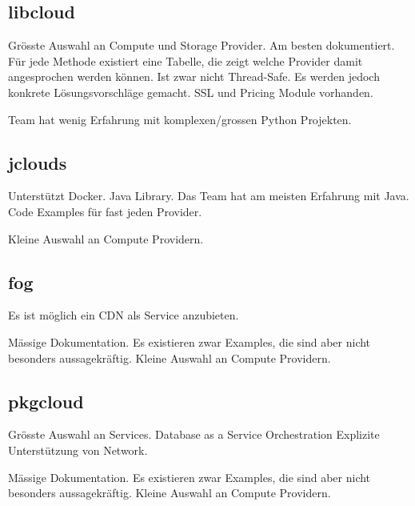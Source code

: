 \subsection{libcloud}
\begin{Argumentation}
\pro Grösste Auswahl an Compute und Storage Provider.
\pro Am besten dokumentiert. Für jede Methode existiert eine Tabelle, die zeigt welche Provider damit angesprochen werden können.
\pro Ist zwar nicht Thread-Safe. Es werden jedoch konkrete Lösungsvorschläge gemacht.
\pro SSL und Pricing Module vorhanden.

\contra Team hat wenig Erfahrung mit komplexen/grossen Python Projekten.
\end{Argumentation}

\subsection{jclouds}
\begin{Argumentation}
\pro Unterstützt Docker.
\pro Java Library. Das Team hat am meisten Erfahrung mit Java.
\pro Code Examples für fast jeden Provider.

\contra Kleine Auswahl an Compute Providern.
\end{Argumentation}

\subsection{fog}
\begin{Argumentation}
\pro Es ist möglich ein CDN als Service anzubieten.

\contra Mässige Dokumentation. Es existieren zwar 
Examples, die sind aber nicht besonders aussagekräftig.
\contra Kleine Auswahl an Compute Providern.
\end{Argumentation}

\subsection{pkgcloud}
\begin{Argumentation}
\pro Grösste Auswahl an Services.
\pro Database as a Service
\pro Orchestration
\pro Explizite Unterstützung von Network.

\contra Mässige Dokumentation. Es existieren zwar Examples, die sind aber nicht besonders aussagekräftig.
\contra Kleine Auswahl an Compute Providern.
\end{Argumentation}

